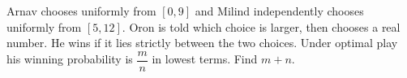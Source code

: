 Arnav chooses uniformly from $[0,9]$ and Milind independently chooses uniformly from $[5,12]$. Oron is told which choice is larger, then chooses a real number. He wins if it lies strictly between the two choices. Under optimal play his winning probability is $\dfrac{m}{n}$ in lowest terms. Find $m+n$.
